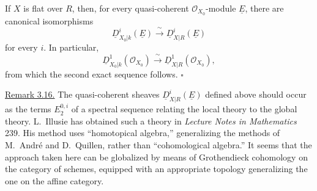 
If $X$ is flat over $R$, then, for every quasi-coherent
$\mathcal O_{X_0}$-module $\underline E$, there are canonical
isomorphisms
\[
 \underline D^i_{X_0|k}(\underline E)
 \xrightarrow{\ \sim\ }
 \underline D^i_{X|R}(\underline E)
\]
for every $i$. In particular,
\[
 \underline D^1_{X_0|k}(\mathcal O_{X_0})
 \xrightarrow{\ \sim\ }
 \underline D^1_{X|R}(\mathcal O_{X_0}),
\]
from which the second exact sequence follows.
\hfill$\square$

\underline{Remark 3.16.}
The quasi-coherent sheaves $\underline D^i_{X|R}(\underline E)$
defined above should occur as the terms $E_2^{0,i}$ of a spectral
sequence relating the local theory to the global theory. L.~Illusie
has obtained such a theory in \emph{Lecture Notes in Mathematics}
239. His method uses ``homotopical algebra,'' generalizing the methods
of M.~André and D.~Quillen, rather than ``cohomological algebra.'' It
seems that the approach taken here can be globalized by means of
Grothendieck cohomology on the category of schemes, equipped with an
appropriate topology generalizing the one on the affine category.
